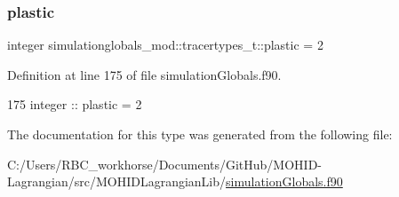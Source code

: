 \subsubsection{\texorpdfstring{plastic}{plastic}}
{\footnotesize\ttfamily integer simulationglobals\+\_\+mod\+::tracertypes\+\_\+t\+::plastic = 2\hspace{0.3cm}{\ttfamily [private]}}



Definition at line 175 of file simulation\+Globals.\+f90.


\begin{DoxyCode}
175         \textcolor{keywordtype}{integer} :: plastic = 2
\end{DoxyCode}


The documentation for this type was generated from the following file\+:\begin{DoxyCompactItemize}
\item 
C\+:/\+Users/\+R\+B\+C\+\_\+workhorse/\+Documents/\+Git\+Hub/\+M\+O\+H\+I\+D-\/\+Lagrangian/src/\+M\+O\+H\+I\+D\+Lagrangian\+Lib/\mbox{\hyperlink{simulation_globals_8f90}{simulation\+Globals.\+f90}}\end{DoxyCompactItemize}
